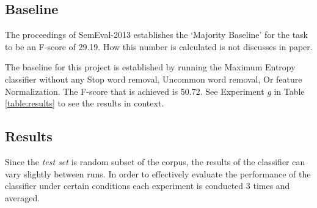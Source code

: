 \documentclass[12pt]{article}
\begin{document}
\subsection{Baseline}

The proceedings of SemEval-2013 establishes the `Majority Baseline' for the
task to be an F-score of 29.19. How this number is calculated is not discusses
in paper.

The baseline for this project is established by running the Maximum Entropy
classifier without any Stop word removal, Uncommon word removal, Or feature
Normalization. The F-score that is achieved is 50.72. See Experiment \textit{g}
in Table \ref{table:results} to see the results in context.

\subsection{Results}

Since the \textit{test set} is random subset of the corpus, the results of the
classifier can vary slightly between runs. In order to effectively evaluate the
performance of the classifier under certain conditions each experiment is
conducted 3 times and averaged.
\end{document}
